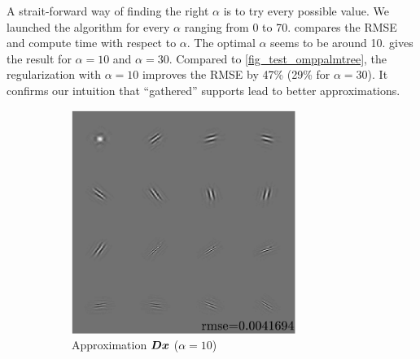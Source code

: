A strait-forward way of finding the right $\alpha$ is to try every possible value. We launched the algorithm for every $\alpha$ ranging from 0 to 70.  compares the RMSE and compute time with respect to $\alpha$. The optimal $\alpha$ seems to be around 10.
 gives the result for $\alpha=10$ and $\alpha=30$. Compared to \cref{fig_test_omppalmtree}, the regularization with $\alpha=10$ improves the RMSE by 47\% (29\% for $\alpha=30$). It confirms our intuition that “gathered” supports lead to better approximations.



\begin{figure}[!h] \centering
\begin{subfigure}[b]{0.49\textwidth}\centering
\includegraphics[width=0.8\textwidth]{figures/tree-unbalanced-supp/xp_learnsupp256_curvelet_decomp3[tree-binary_dpth4]_supp-diracs_[usegrad1_every5_add5_totinit0_totadd279_alpha10]_approx.pdf}
\caption{Approximation $\bm{D}\bm{x}$ ($\alpha=10$)}
\end{subfigure}
\begin{subfigure}[b]{0.49\textwidth}\centering

\end{subfigure}
\end{figure}
